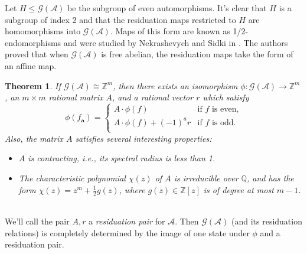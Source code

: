 \documentclass[12pt, letterpaper]{article}
\newcommand{\Z}{\mathbb Z}
\newcommand{\Q}{\mathbb Q}
\newcommand{\A}{\mathcal A}
\newcommand{\ch}[1]{\mathbf{#1}}
\newcommand{\res}[2]{{{#1}_{\ch{#2}}}}
\newcommand{\gp}{\mathcal G}
\newtheorem{thm}{Theorem}[section]
\begin{document}
Let $H \le \gp(\A)$ be the subgroup of even automorphisms. It's clear that $H$
is a subgroup of index 2 and that the residuation maps restricted to $H$ are
homomorphisms into $\gp(\A)$. Maps of this form are known as 1/2-endomorphisms
and were studied by Nekrashevych and Sidki in
\cite{nekrashevych2004automorphisms}. The authors proved that when $\gp(\A)$ is
free abelian, the residuation maps take the form of an affine map.
\begin{thm}\label{thm:nekrashevych_sidki}
    If $\gp(\A) \cong \Z^m$, then there exists an isomorphism $\phi : \gp(\A)
    \rightarrow \Z^m$, an $m \times m$ rational matrix $A$, and a rational
    vector $r$ which satisfy
    \begin{equation}\label{eq:Aresiduals}
        \phi(\res{f}{a}) = \begin{cases}
            A \cdot \phi(f) & \text{if $f$ is even,}\\
            A \cdot \phi(f) + (-1)^a r &
            \text{if $f$ is odd.}\\
        \end{cases}
    \end{equation}
    Also, the matrix $A$ satisfies several interesting properties:
    \begin{itemize}
        \item $A$ is contracting, i.e., its spectral radius is less than 1.
        \item The characteristic polynomial $\chi(z)$ of $A$ is irreducible
            over $\Q$, and has the form $\chi(z) = z^m + \frac{1}{2}g(z)$,
            where $g(z) \in \Z[z]$ is of degree at most $m-1$.
    \end{itemize}
\end{thm}\hfill\\
We'll call the pair $A, r$ a \emph{residuation pair} for $\A$.  Then $\gp(\A)$
(and its residuation relations) is completely determined by the image of one
state under $\phi$ and a residuation pair.
\end{document}
